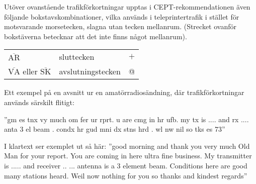 Utöver ovanstående trafikförkortningar upptas i CEPT-rekommendationen
även följande bokstavskombinationer, vilka används i teleprintertrafik
i stället för motsvarande morsetecken, slagna utan tecken mellanrum.
(Strecket ovanför bokstäverna betecknar att det inte finns något
mellanrum).

\begin{tabular}{lll}
  \(\overline{\mathrm{AR}}\) & sluttecken & \(+\) \\
  \(\overline{\mathrm{VA}}\) eller \(\overline{\mathrm{SK}}\) & avslutningstecken & @ \\
\end{tabular}

Ett exempel på en avsnitt ur en amatörradiosändning, där
trafikförkortningar används särskilt flitigt:

''gm es tnx vy much om fer ur rprt. u are cmg in hr ufb. my tx is
.... and rx .... anta 3 el beam . condx hr gud mni dx stns hrd . wl nw
nil so tks es 73''

I klartext ser exemplet ut så här: ''good morning and thank you very
much Old Man for your report. You are coming in here ultra fine
business. My transmitter is .....  and receiver .. ... antenna is a 3
element beam. Conditions here are good many stations heard. Weil now
nothing for you so thanks and kindest regards''